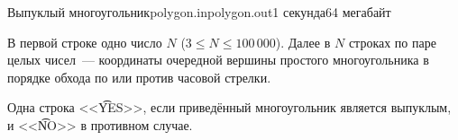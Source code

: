 \begin{problem}{Выпуклый многоугольник}{polygon.in}{polygon.out}{1 секунда}{64 мегабайт}

\InputFile

В первой строке одно число $N$ ($3 \le N \le 100\,000$).
Далее в $N$ строках по паре целых чисел~--- координаты очередной вершины
простого многоугольника в порядке обхода по или против часовой стрелки.

\OutputFile

Одна строка <<\t{YES}>>, если приведённый многоугольник является выпуклым,
и <<\t{NO}>> в противном случае.

\Example

\begin{example}
%
\end{example}

\end{problem}
